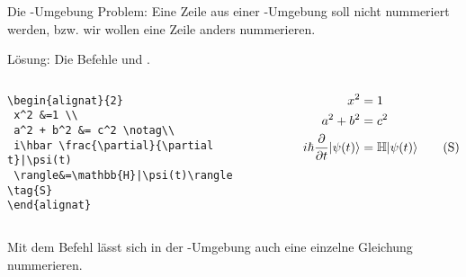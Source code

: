 \begin{frame}[fragile]{Die -Umgebung}
Problem: Eine Zeile aus einer -Umgebung soll nicht nummeriert werden, bzw. wir wollen eine Zeile anders nummerieren.

\medskip\pause
Lösung: Die Befehle  und .

\begin{columns}
\begin{column}{0.5\textwidth}
\begin{codeblock}
\begin{tiny}
\begin{verbatim}
\begin{alignat}{2}
 x^2 &=1 \\
 a^2 + b^2 &= c^2 \notag\\ 
 i\hbar \frac{\partial}{\partial t}|\psi(t)
 \rangle&=\mathbb{H}|\psi(t)\rangle \tag{S}
\end{alignat}
\end{verbatim}
\end{tiny}
\end{codeblock}
\end{column}
\begin{column}{0.45\textwidth}
\begin{alignat}{2}
 x^2 &=1 \\
 a^2 + b^2 &= c^2 \notag\\ 
 i\hbar \frac{\partial}{\partial t}|\psi(t)\rangle&=\mathbb{H}|\psi(t)\rangle \tag{S}
\end{alignat}
\end{column}
\end{columns}

\medskip\pause
Mit dem Befehl  lässt sich in der -Umgebung auch eine einzelne Gleichung nummerieren. 
\end{frame}

